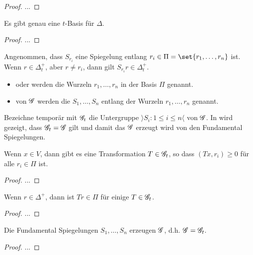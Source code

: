 \begin{proof}
	...
\end{proof}
\begin{proposition}
	Es gibt genau eine $t$-Basis für $\Delta$.
\end{proposition}
\begin{proof}
	...
\end{proof}
\begin{proposition}
	Angenommen, dass $S_{r_i}$ eine Spiegelung entlang $r_i \in \Pi = \set{r_1, \dots, r_n}$ ist.\\
	Wenn $r \in \Delta_t^+$, aber $r \neq r_i$, dann gilt $S_{r_i}r \in \Delta_t^+$.
\end{proposition}
\begin{*definition}
	\begin{itemize}
		\item {} oder  werden die Wurzeln $r_1, \dots, r_n$ in der Basis $\Pi$ genannt.
		\item {} von $\mathscr G$ werden die $S_1, \dots, S_n$ entlang der Wurzeln $r_1, \dots, r_n$ genannt.
	\end{itemize}
\end{*definition}
Bezeichne temporär mit $\mathscr G_t$ die Untergruppe $\rangle S_i \colon 1 \le i \le n\langle$ von $\mathscr G$. In  wird gezeigt, dass $\mathscr G_t = \mathscr G$ gilt und damit das $\mathscr G$ erzeugt wird von den Fundamental Spiegelungen.
\begin{proposition}
	Wenn $x \in V$, dann gibt es eine Transformation $T \in \mathscr G_t$, so dass $(Tx, r_i) \ge 0$ für alle $r_i \in \Pi$ ist.
\end{proposition}
\begin{proof}
	...
\end{proof}
\begin{proposition}
	Wenn $r \in \Delta^+$, dann ist $Tr \in \Pi$ für einige $T \in \mathscr G_t$.
\end{proposition}
\begin{proof}
	...
\end{proof}
\begin{theorem}
	Die Fundamental Spiegelungen $S_1, \dots, S_n$ erzeugen $\mathscr G$, d.h. $\mathscr G = \mathscr G_t$.
\end{theorem}
\begin{proof}
	...
\end{proof}